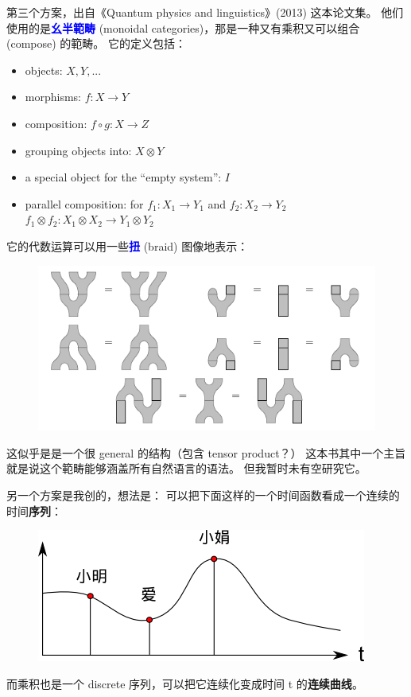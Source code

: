\documentclass[12pt]{article}
\newcommand{\concept}[1]{\textbf{\textcolor{blue}{#1}}}
\newcommand{\tab}{\hspace*{1cm}}
\begin{document}
第三个方案，出自《Quantum physics and linguistics》(2013) 这本论文集。 他们使用的是\concept{幺半範畴} (monoidal categories)，那是一种又有乘积又可以组合 (compose) 的範畴。 它的定义包括：
\begin{itemize}
\item objects: $X, Y, ...$
\item morphisms: $f: X \rightarrow Y$
\item composition: $f \circ g : X \rightarrow Z$
\item grouping objects into: $X \otimes Y$
\item a special object for the ``empty system'': $I$
\item parallel composition: for $f_1: X_1 \rightarrow Y_1$ and $f_2: X_2 \rightarrow Y_2$ \\
\tab \tab $f_1 \otimes f_2: X_1 \otimes X_2 \rightarrow Y_1 \otimes Y_2$
\end{itemize}
它的代数运算可以用一些\concept{扭} (braid) 图像地表示：
\begin{figure}[H]
\centering
\includegraphics[scale=0.75]{frobenius_algebra.jpg}
\end{figure}
这似乎是是一个很 general 的结构（包含 tensor product？）  这本书其中一个主旨就是说这个範畴能够涵盖所有自然语言的语法。 但我暂时未有空研究它。

另一个方案是我创的，想法是： 可以把下面这样的一个时间函数看成一个连续的时间\textbf{序列}：
\begin{figure}[H]
\centering
\includegraphics[scale=0.75]{continuous-time-sequence.png}
\end{figure}
而乘积也是一个 discrete 序列，可以把它连续化变成时间 t 的\textbf{连续曲线}。
\end{document}
